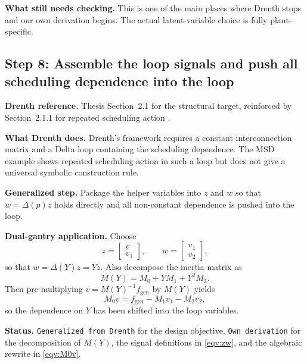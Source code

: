 ﻿\documentclass[11pt]{article}
\newcommand{\audititem}[2]{\par\smallskip\noindent\textbf{#1.} #2\par}
\newcommand{\statusline}[1]{\texttt{#1}}
\begin{document}
\audititem{What still needs checking}{This is one of the main places where
Drenth stops and our own derivation begins. The actual latent-variable choice is
fully plant-specific.}

\subsection{Step 8: Assemble the loop signals and push all scheduling dependence into the loop}

\audititem{Drenth reference}{Thesis Section~2.1 for the structural target,
reinforced by Section~2.1.1 for repeated scheduling action
\cite{drenth2025thesis}.}

\audititem{What Drenth does}{Drenth's framework requires a constant
interconnection matrix and a Delta loop containing the scheduling dependence.
The MSD example shows repeated scheduling action in such a loop but does not
give a universal symbolic construction rule.}

\audititem{Generalized step}{Package the helper variables into $z$ and $w$ so
that $w=\Delta(p)z$ holds directly and all non-constant dependence is pushed
into the loop.}

\audititem{Dual-gantry application}{Choose
\begin{equation}
    z = \begin{bmatrix} v \\ v_1 \end{bmatrix}, \qquad
    w = \begin{bmatrix} v_1 \\ v_2 \end{bmatrix},
    \label{eqv:zw}
\end{equation}
so that $w = \Delta(Y) z = Y z$. Also decompose the inertia matrix as
\begin{equation}
    M(Y) = M_0 + Y M_1 + Y^2 M_2.
    \label{eqv:decomp}
\end{equation}
Then pre-multiplying $v = M(Y)^{-1} f_{\mathrm{gen}}$ by $M(Y)$ yields
\begin{equation}
    M_0 v = f_{\mathrm{gen}} - M_1 v_1 - M_2 v_2,
    \label{eqv:M0v}
\end{equation}
so the dependence on $Y$ has been shifted into the loop variables.}

\audititem{Status}{\statusline{Generalized from Drenth} for the design
objective. \statusline{Own derivation} for the decomposition of $M(Y)$, the
signal definitions in \eqref{eqv:zw}, and the algebraic rewrite in
\eqref{eqv:M0v}.}
\end{document}
